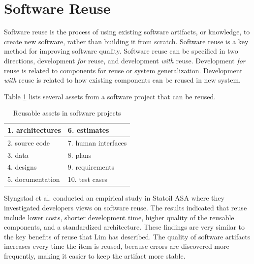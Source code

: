 {%


\section{Software Reuse}
\label{sec:2-SR}
Software reuse is the process of using existing software artifacts, or knowledge, to create new software, rather than building it from scratch. Software reuse is a key method for improving software quality\cite{frakes1996software}. Software reuse can be specified in two directions, development \textit{for} reuse, and development \textit{with} reuse\cite{Slyngstad:2006:ESD:1159733.1159770}. Development \textit{for} reuse is related to components for reuse or system generalization. Development \textit{with} reuse is related to how existing components can be reused in new system.

Table \ref{tab:reusableComponents} lists several assets from a software project that can be reused\cite{frakes1996software}.
\begin{table}[H]
	\centering
	\begin{tabular}{ | l | l |}
	\hline
	1. architectures & 6. estimates \\ \hline
	2. source code & 7. human interfaces \\ \hline
	3. data & 8. plans \\ \hline
	4. designs & 9. requirements \\ \hline
	5. documentation & 10. test cases \\
	\hline
	\end{tabular}
	\caption{Reusable assets in software projects} \label{tab:reusableComponents}
\end{table}

Slyngstad et al.\cite{Slyngstad:2006:ESD:1159733.1159770} conducted an empirical study in Statoil ASA where they investigated developers views on software reuse. The results indicated that reuse include lower costs, shorter development time, higher quality of the reusable components, and a standardized architecture. These findings are very similar to the key benefits of reuse that Lim has described\cite{lim1994effects}. The quality of software artifacts increases every time the item is reused, because errors are discovered more frequently, making it easier to keep the artifact more stable\cite{sametinger1997software}.

}
